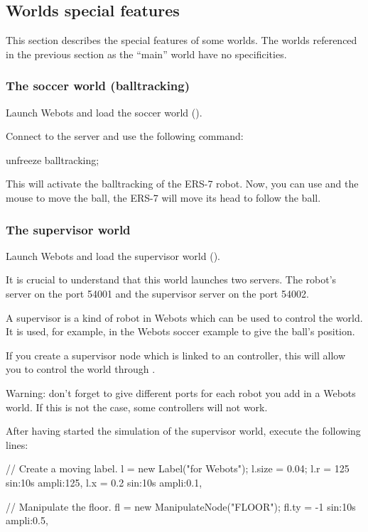 \subsection{Worlds special features}

This section describes the special features of some worlds.  The
worlds referenced in the previous section as the ``main'' world have
no specificities.


\subsubsection{The soccer world (balltracking)}

Launch Webots and load the soccer world
().


Connect to the \urbi server and use the following command:

\begin{urbifixme}
unfreeze balltracking;
\end{urbifixme}

This will activate the balltracking of the ERS-7 robot.  Now, you can
use  and the mouse to move the ball, the ERS-7 will move
its head to follow the ball.


\subsubsection{The supervisor world}

Launch Webots and load the supervisor world
().

It is crucial to understand that this world launches two \urbi
servers.  The robot's server on the port 54001 and the supervisor
server on the port 54002.

A supervisor is a kind of robot in Webots which can be used to control
the world. It is used, for example, in the Webots soccer example to
give the ball's position.

If you create a supervisor node which is linked to an \urbi
controller, this will allow you to control the world through \urbi.

Warning: don't forget to give different ports for each robot you add
in a Webots world. If this is not the case, some controllers will not
work.

After having started the simulation of the supervisor world, execute
the following lines:


\begin{urbifixme}
// Create a moving label.
l = new Label("\urbi for Webots");
l.size = 0.04;
l.r = 125 sin:10s ampli:125,
l.x = 0.2 sin:10s ampli:0.1,

// Manipulate the floor.
fl = new ManipulateNode("FLOOR");
fl.ty = -1 sin:10s ampli:0.5,
\end{urbifixme}

